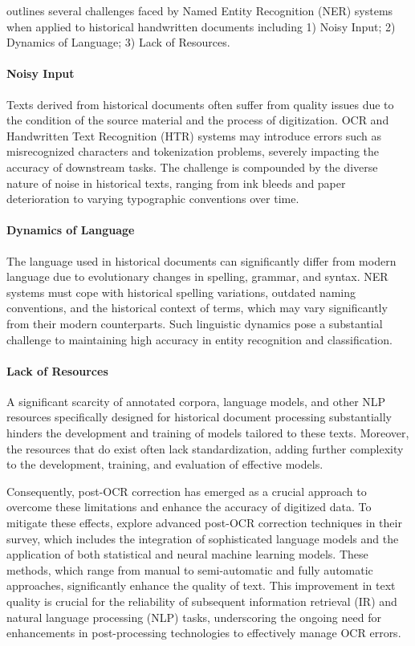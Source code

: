 \cite{ehrmann2023named} outlines several challenges faced by Named Entity Recognition (NER) systems when applied to historical handwritten documents including 1) Noisy Input; 2) Dynamics of Language; 3) Lack of Resources. 

\paragraph*{Noisy Input}
\label{par:1_noisy_input}
Texts derived from historical documents often suffer from quality issues due to the condition of the source material and the process of digitization. OCR and Handwritten Text Recognition (HTR) systems may introduce errors such as misrecognized characters and tokenization problems, severely impacting the accuracy of downstream tasks. The challenge is compounded by the diverse nature of noise in historical texts, ranging from ink bleeds and paper deterioration to varying typographic conventions over time.

\paragraph*{Dynamics of Language}
\label{par:1_dynamics_of_language}
The language used in historical documents can significantly differ from modern language due to evolutionary changes in spelling, grammar, and syntax. NER systems must cope with historical spelling variations, outdated naming conventions, and the historical context of terms, which may vary significantly from their modern counterparts. Such linguistic dynamics pose a substantial challenge to maintaining high accuracy in entity recognition and classification.

\paragraph*{Lack of Resources}
\label{par:1_lack_of_resources}
A significant scarcity of annotated corpora, language models, and other NLP resources specifically designed for historical document processing substantially hinders the development and training of models tailored to these texts. Moreover, the resources that do exist often lack standardization, adding further complexity to the development, training, and evaluation of effective models.

Consequently, post-OCR correction has emerged as a crucial approach to overcome these limitations and enhance the accuracy of digitized data. To mitigate these effects, \cite{nguyen2021survey} explore advanced post-OCR correction techniques in their survey, which includes the integration of sophisticated language models and the application of both statistical and neural machine learning models. These methods, which range from manual to semi-automatic and fully automatic approaches, significantly enhance the quality of text. This improvement in text quality is crucial for the reliability of subsequent information retrieval (IR) and natural language processing (NLP) tasks, underscoring the ongoing need for enhancements in post-processing technologies to effectively manage OCR errors.

